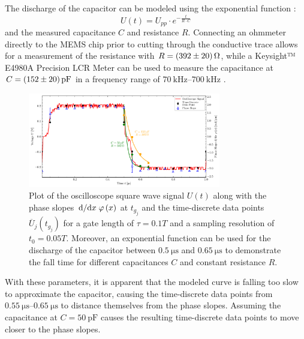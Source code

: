 The discharge of the capacitor can be modeled using the exponential function \cite{carr2001}: $$U\left(t\right) = U_{pp} \cdot e^{-\frac{t}{R\cdot C}}$$ and the measured capacitance $C$ and resistance $R$. Connecting an ohmmeter directly to the MEMS chip prior to cutting through the conductive trace allows for a measurement of the resistance with $R = \SI{392 \pm 20}{\ohm}$, while a Keysight™ E4980A Precision LCR Meter can be used to measure the capacitance at $C = \SI{152 \pm 20}{\pico\farad}$ in a frequency range of $\SIrange{70}{700}{\kilo\hertz}$ \cite{Wagner2018}.
\begin{figure}[H]
	\centering
	\includegraphics[width=0.75\textwidth]{Figures/Slope/square_slope.pdf}
	\caption{Plot of the oscilloscope square wave signal $U\left(t\right)$ along with the phase slopes $\dv*{}{x} \varphi\left(x\right)$ at $t_{g_j}$ and the time-discrete data points $\overline{U}_j\left(t_{g_j}\right)$ for a gate length of $\tau = 0.1T$ and a sampling resolution of $t_0 = 0.05T$. Moreover, an exponential function can be used for the discharge of the capacitor between $\SI{0.5}{\micro\second}$ and $\SI{0.65}{\micro\second}$ to demonstrate the fall time for different capacitances $C$ and constant resistance $R$.}
	\label{fig:square-slope}
\end{figure}
With these parameters, it is apparent that the modeled curve is falling too slow to approximate the capacitor, causing the time-discrete data points from $\SIrange{0.55}{0.65}{\micro\second}$ to distance themselves from the phase slopes. Assuming the capacitance at $C =\SI{50}{\pico\farad}$ causes the resulting time-discrete data points to move closer to the phase slopes.

